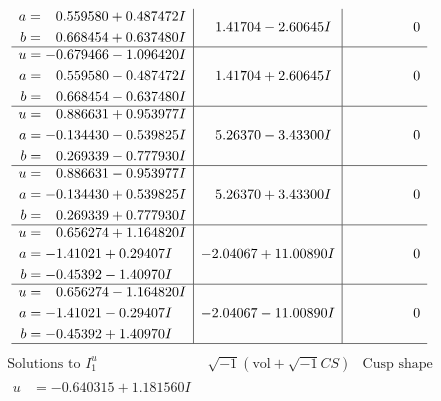 \documentclass[1p]{elsarticle_modified}
\theoremstyle{definition}
\newcommand{\I}{\sqrt{-1}}
\begin{document}
$$\begin{array}{c|c|c}
\begin{aligned}
a &= \phantom{-}0.559580 + 0.487472 I \\
b &= \phantom{-}0.668454 + 0.637480 I\end{aligned}
 & \phantom{-}1.41704 - 2.60645 I & \phantom{-0.000000 } 0 \\ \hline\begin{aligned}
u &= -0.679466 - 1.096420 I \\
a &= \phantom{-}0.559580 - 0.487472 I \\
b &= \phantom{-}0.668454 - 0.637480 I\end{aligned}
 & \phantom{-}1.41704 + 2.60645 I & \phantom{-0.000000 } 0 \\ \hline\begin{aligned}
u &= \phantom{-}0.886631 + 0.953977 I \\
a &= -0.134430 - 0.539825 I \\
b &= \phantom{-}0.269339 - 0.777930 I\end{aligned}
 & \phantom{-}5.26370 - 3.43300 I & \phantom{-0.000000 } 0 \\ \hline\begin{aligned}
u &= \phantom{-}0.886631 - 0.953977 I \\
a &= -0.134430 + 0.539825 I \\
b &= \phantom{-}0.269339 + 0.777930 I\end{aligned}
 & \phantom{-}5.26370 + 3.43300 I & \phantom{-0.000000 } 0 \\ \hline\begin{aligned}
u &= \phantom{-}0.656274 + 1.164820 I \\
a &= -1.41021 + 0.29407 I \\
b &= -0.45392 - 1.40970 I\end{aligned}
 & -2.04067 + 11.00890 I & \phantom{-0.000000 } 0 \\ \hline\begin{aligned}
u &= \phantom{-}0.656274 - 1.164820 I \\
a &= -1.41021 - 0.29407 I \\
b &= -0.45392 + 1.40970 I\end{aligned}
 & -2.04067 - 11.00890 I & \phantom{-0.000000 } 0\\
 \hline 
 \end{array}$$\newpage$$\begin{array}{c|c|c}  
\text{Solutions to }I^u_{1}& \I (\text{vol} + \sqrt{-1}CS) & \text{Cusp shape}\\
 \hline 
\begin{aligned}
u &= -0.640315 + 1.181560 I \\

\end{aligned}
\end{array}$$
\end{document}

